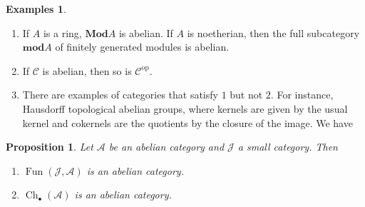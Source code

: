 \documentclass{article}
\newcommand{\op}{\mathrm{op}}
\newcommand{\Q}{\mathbb{Q}}
\newcommand{\R}{\mathbb{R}}
\newcommand{\cat}{\mathcal{C}}
\newcommand{\Jcat}{\mathcal{J}}
\newcommand{\Acat}{\mathcal{A}}
\newcommand{\Mod}{\mathbf{Mod}}
\DeclareMathOperator{\Ch}{Ch}
\DeclareMathOperator{\Fun}{Fun}
\theoremstyle{plain}
\newtheorem{proposition}[theorem]{Proposition}
\theoremstyle{definition}
\newtheorem{examples}[theorem]{Examples}
\theoremstyle{remark}
\begin{document}
\begin{examples}\leavevmode
    \begin{enumerate}
        \item If $A$ is a ring, $\Mod A$ is abelian. If $A$ is noetherian, then the full subcategory $\mathbf{mod}A$ of finitely generated modules is abelian.
        \item If $\cat$ is abelian, then so is $\cat^\op$.
        \item There are examples of categories that satisfy $1$ but not $2$. For instance, Hausdorff topological abelian groups, where kernels are given by the usual kernel and cokernels are the quotients by the closure of the image. We have
        \begin{center}
        \end{center}
    \end{enumerate}
\end{examples}

\begin{proposition}
    Let $\Acat$ be an abelian category and $\Jcat$ a small category. Then
    \begin{enumerate}
        \item $\Fun(\Jcat,\Acat)$ is an abelian category.
        \item $\Ch_\bullet (\Acat)$ is an abelian category.
    \end{enumerate}
\end{proposition}
\end{document}
